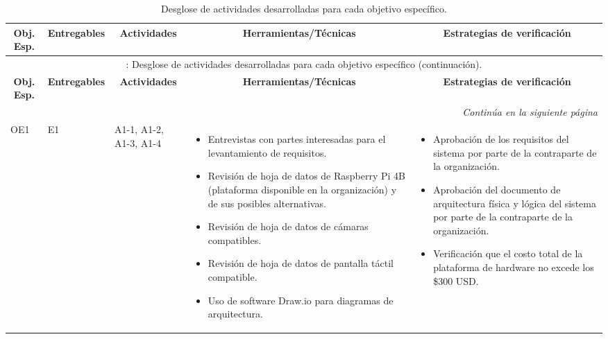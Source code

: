 \begin{landscape} %
    \begin{longtable}{l|l|p{2.5cm}|p{7cm}|p{7cm}}
        \caption{Desglose de actividades desarrolladas para cada objetivo específico.} \label{tab:activities} \\
        \hline
        \multicolumn{1}{c|}{\textbf{Obj. Esp.}} & \multicolumn{1}{c|}{\textbf{Entregables}} & \multicolumn{1}{c|}{\textbf{Actividades}} & \multicolumn{1}{c|}{\textbf{Herramientas/Técnicas}} & \multicolumn{1}{c}{\textbf{Estrategias de verificación}} \\ \hline
        \endfirsthead

        \multicolumn{5}{c}{\tablename \thetable{}: Desglose de actividades desarrolladas para cada objetivo específico (continuación).} \\
        \hline

        \multicolumn{1}{c|}{\textbf{Obj. Esp.}} & \multicolumn{1}{c|}{\textbf{Entregables}} & \multicolumn{1}{c|}{\textbf{Actividades}} & \multicolumn{1}{c|}{\textbf{Herramientas/Técnicas}} & \multicolumn{1}{c}{\textbf{Estrategias de verificación}} \\ \hline
        \endhead

        \hline
        \multicolumn{5}{r}{\textit{Continúa en la siguiente página}} \\ \hline
        \endfoot

        \hline
        \endlastfoot

        OE1 & E1 & A1-1, A1-2, A1-3, A1-4 & \vspace{-\baselineskip}
        \setlength{\leftmargini}{1em}
        \begin{itemize}
            \item Entrevistas con partes interesadas para el levantamiento de requisitos.
            \item Revisión de hoja de datos de Raspberry Pi 4B (plataforma disponible en la organización) y de sus posibles alternativas.
            \item Revisión de hoja de datos de cámaras compatibles.
            \item Revisión de hoja de datos de pantalla táctil compatible.
            \item Uso de software Draw.io para diagramas de arquitectura.
        \end{itemize} & \vspace{-\baselineskip}
        \setlength{\leftmargini}{1em}
        \begin{itemize}
            \item Aprobación de los requisitos del sistema por parte de la contraparte de la organización.
            \item Aprobación del documento de arquitectura física y lógica del sistema por parte de la contraparte de la organización.
            \item Verificación que el costo total de la plataforma de hardware no excede los \$300 USD.
        \end{itemize} \\
        \hline


\end{longtable}
\end{landscape}
